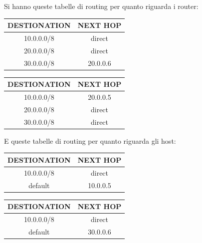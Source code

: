 Si hanno queste tabelle di routing per quanto riguarda i router:
\begin{center}
    \begin{minipage}{.4\textwidth}
        \begin{tabular}{ || c | c ||}
            \hline
            \textbf{DESTIONATION} & \textbf{NEXT HOP} \\
            \hline
            \hline
            10.0.0.0/8 & direct \\
            \hline
            20.0.0.0/8 & direct \\
            \hline
            30.0.0.0/8 & 20.0.0.6 \\
            \hline
        \end{tabular}
    \end{minipage}
    \begin{minipage}{.4\textwidth}
        \begin{tabular}{ || c | c ||}
            \hline
            \textbf{DESTIONATION} & \textbf{NEXT HOP} \\
            \hline 
            \hline
            10.0.0.0/8 & 20.0.0.5 \\
            \hline
            20.0.0.0/8 & direct \\
            \hline
            30.0.0.0/8 & direct \\
            \hline
        \end{tabular}
    \end{minipage}
\end{center}

E queste tabelle di routing per quanto riguarda gli host:
\begin{center}
    \begin{minipage}{.4\textwidth}
        \begin{tabular}{ || c | c || }
            \hline
            \textbf{DESTIONATION} & \textbf{NEXT HOP} \\
            \hline
            \hline
            10.0.0.0/8 & direct \\
            \hline
            default & 10.0.0.5 \\
            \hline
        \end{tabular}
    \end{minipage}
    \begin{minipage}{.4\textwidth}
        \begin{tabular}{ || c | c || }
            \hline
            \textbf{DESTIONATION} & \textbf{NEXT HOP} \\
            \hline
            \hline
            10.0.0.0/8 & direct \\
            \hline
            default & 30.0.0.6 \\
            \hline
        \end{tabular}
        \label{Tabella di Routing di 30.0.0.1}
    \end{minipage}
\end{center}

